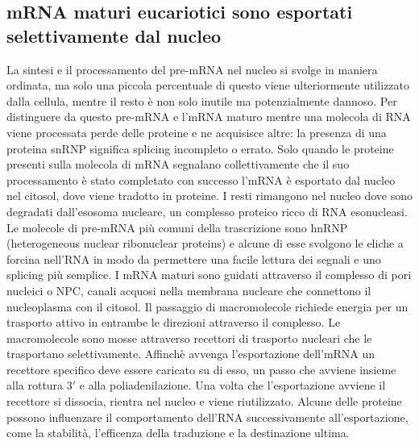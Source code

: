 \subsection{mRNA maturi eucariotici sono esportati selettivamente dal nucleo}
La sintesi e il processamento del pre-mRNA nel nucleo si svolge in maniera ordinata, ma solo una piccola percentuale di questo viene ulteriormente utilizzato dalla cellula, mentre il
resto \`e non solo inutile ma potenzialmente dannoso. Per distinguere da questo pre-mRNA e l'mRNA maturo mentre una molecola di RNA viene processata perde delle proteine e ne 
acquisisce altre: la presenza di una proteina snRNP significa splicing incompleto o errato. Solo quando le proteine presenti sulla molecola di mRNA segnalano collettivamente che il
suo processamento \`e stato completato con successo l'mRNA \`e esportato dal nucleo nel citosol, dove viene tradotto in proteine. I resti rimangono nel nucleo dove sono degradati
dall'esosoma nucleare, un complesso proteico ricco di RNA esonucleasi. Le molecole di pre-mRNA pi\`u comuni della trascrizione sono hnRNP (heterogeneous nuclear ribonuclear proteins) e 
alcune di esse svolgono le eliche a forcina nell'RNA in modo da permettere una facile lettura dei segnali e uno splicing pi\`u semplice. I mRNA maturi sono guidati attraverso il 
complesso di pori nucleici o NPC, canali acquosi nella membrana nucleare che connettono il nucleoplasma con il citosol. Il passaggio di macromolecole richiede energia per un trasporto
attivo in entrambe le direzioni attraverso il complesso. Le macromolecole sono mosse attraverso recettori di trasporto nucleari che le trasportano selettivamente. Affinch\`e avvenga 
l'esportazione dell'mRNA un recettore specifico deve essere caricato su di esso, un passo che avviene insieme alla rottura $3'$ e alla poliadenilazione. Una volta che l'esportazione
avviene il recettore si dissocia, rientra nel nucleo e viene riutilizzato. Alcune delle proteine possono influenzare il comportamento dell'RNA successivamente all'esportazione, come
la stabilit\`a, l'efficenza della traduzione e la destinazione ultima. 

